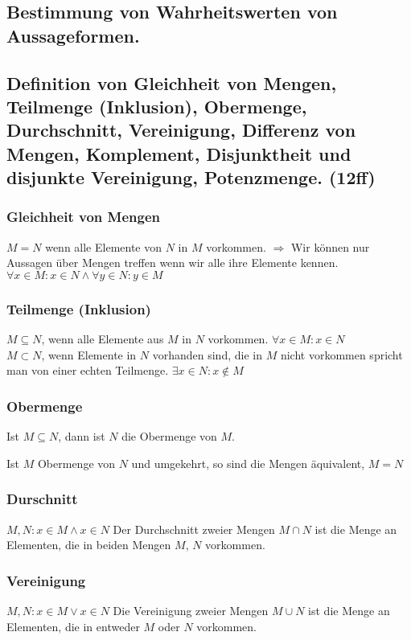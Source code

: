 \documentclass[10pt,a4paper,twoside]{article}
\begin{document}
\subsection{Bestimmung von Wahrheitswerten von Aussageformen.}

\subsection{Definition von Gleichheit von Mengen, Teilmenge (Inklusion), Obermenge, Durchschnitt, Vereinigung, Differenz von Mengen, Komplement, Disjunktheit und disjunkte Vereinigung, Potenzmenge. (12ff)}
\subsubsection{Gleichheit von Mengen}
$M = N$ wenn alle Elemente von $N$ in $M$ vorkommen. $\Rightarrow$ Wir können nur Aussagen über Mengen treffen wenn wir alle ihre Elemente kennen. $\forall x \in M: x \in N \wedge \forall y \in N: y \in M$
\subsubsection{Teilmenge (Inklusion)}
$M \subseteq N$, wenn alle Elemente aus $M$ in $N$ vorkommen. $\forall x \in M: x \in N$ \\
$M \subset N$, wenn Elemente in $N$ vorhanden sind, die in $M$ nicht vorkommen spricht man von einer echten Teilmenge. $\exists x \in N: x \notin M$

\subsubsection{Obermenge}
Ist $M \subseteq N$, dann ist $N$ die Obermenge von $M$.

Ist $M$ Obermenge von $N$ und umgekehrt, so sind die Mengen äquivalent, $M = N$

\subsubsection{Durschnitt}
$M,N : x \in M \wedge x \in N$
Der Durchschnitt zweier Mengen $M \cap N$ ist die Menge an Elementen, die in beiden Mengen $M$, $N$ vorkommen.

\subsubsection{Vereinigung}
$M,N: x \in M \vee x \in N$
Die Vereinigung zweier Mengen $M \cup N$ ist die Menge an Elementen, die in entweder $M$ oder $N$ vorkommen.
\end{document}
